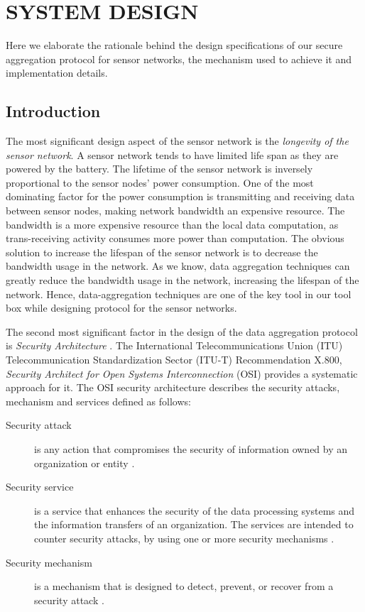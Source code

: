 \chapter{SYSTEM DESIGN} %
\label{cha:System Design}
	
	Here we elaborate the rationale behind the design specifications of our secure aggregation protocol for sensor networks, the mechanism used to achieve it and implementation details.

	\section{Introduction}

	The most significant design aspect of the sensor network is the \textit{longevity of the sensor network}.
	A sensor network tends to have limited life span as they are powered by the battery.
	The lifetime of the sensor network is inversely proportional to the sensor nodes' power consumption.
	One of the most dominating factor for the power consumption is transmitting and receiving data between sensor nodes, making network bandwidth an expensive resource.
	The bandwidth is a more expensive resource than the local data computation, as trans-receiving activity consumes more power than computation.
	The obvious solution to increase the lifespan of the sensor network is to decrease the bandwidth usage in the network.
	As we know, data aggregation techniques can greatly reduce the bandwidth usage in the network, increasing the lifespan of the network.
	Hence, data-aggregation techniques are one of the key tool in our tool box while designing protocol for the sensor networks.

	The second most significant factor in the design of the data aggregation protocol is \textit{Security Architecture }.
	The International Telecommunications Union (ITU) Telecommunication Standardization Sector (ITU-T) Recommendation X.800, \textit{Security Architect for Open Systems Interconnection} (OSI) provides a systematic approach for it.
	The OSI security architecture describes the security attacks, mechanism and services defined as follows:
	\begin{description}
		\item[Security attack] is any action that compromises the security of information owned by an organization or entity \cite{stallings2008computer}.
		\item[Security service] is a service that enhances the security of the data processing systems and the information transfers of an organization. The services are intended to counter security attacks, by using one or more security mechanisms \cite{stallings2008computer}.
		\item[Security mechanism] is a mechanism that is designed to detect, prevent, or recover from a security attack
		\cite{stallings2008computer}.
	\end{description}


